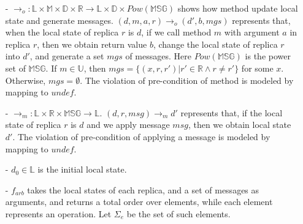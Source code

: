 \begin{itemize}
\setlength{\itemsep}{0.5pt}
\item[-] $\rightarrow_o: \mathbb{L} \times \mathbb{M} \times \mathbb{D} \times \mathbb{R} \rightarrow \mathbb{L} \times \mathbb{D} \times \mathit{Pow}(\mathbb{MSG})$ shows how method update local state and generate messages. $(d,m,a,r) \rightarrow_o (d',b,\mathit{mgs})$ represents that, when the local state of replica $r$ is $d$, if we call method $m$ with argument $a$ in replica $r$, then we obtain return value $b$, change the local state of replica $r$ into $d'$, and generate a set $\mathit{mgs}$ of messages. Here $\mathit{Pow}(\mathbb{MSG})$ is the power set of $\mathbb{MSG}$. If $m \in \mathbb{U}$, then $\mathit{mgs} = \{ (x,r,r') \vert r' \in \mathbb{R} \wedge r \neq r' \}$ for some $x$. Otherwise, $\mathit{mgs} = \emptyset$. {\color {red}The violation of pre-condition of method is modeled by mapping to $\mathit{undef}$.}

\item[-] $\rightarrow_m: \mathbb{L} \times \mathbb{R} \times \mathbb{MSG} \rightarrow \mathbb{L}$. $(d,r,\mathit{msg}) \rightarrow_m d'$ represents that, if the local state of replica $r$ is $d$ and we apply message $\mathit{msg}$, then we obtain local state $d'$. {\color {red}The violation of pre-condition of applying a message is modeled by mapping to $\mathit{undef}$.}

\item[-] $d_0 \in \mathbb{L}$ is the initial local state.

\item[-] $f_{\mathit{arb}}$ takes the local states of each replica, and a set of messages as arguments, and returns a total order over elements, while each element represents an operation. Let $\Sigma_e$ be the set of such elements.



\end{itemize}


